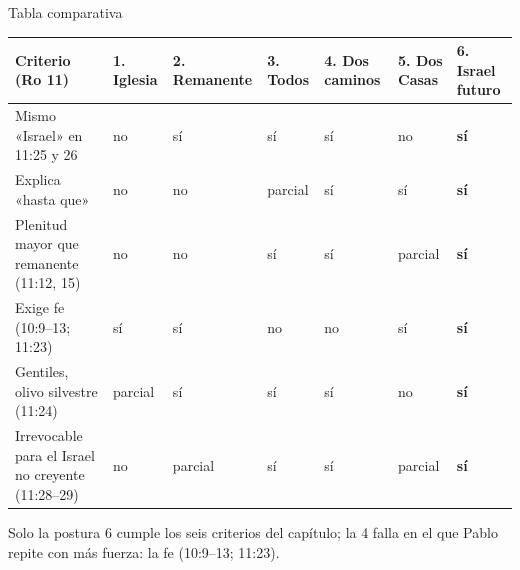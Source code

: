 \begin{frame}{Tabla comparativa}
\centering\scriptsize\renewcommand{\arraystretch}{1.3}
\begin{tabular}{>{\RaggedRight\arraybackslash}p{3.8cm}>{\centering\arraybackslash}p{0.95cm}>{\centering\arraybackslash}p{0.95cm}>{\centering\arraybackslash}p{0.95cm}>{\centering\arraybackslash}p{0.95cm}>{\centering\arraybackslash}p{0.95cm}>{\centering\arraybackslash}p{0.95cm}}
\toprule
\color{ladrillo}\bfseries Criterio (Ro 11) & \textbf{1. Iglesia} & \textbf{2. Rema\-nente} & \textbf{3. Todos} & \textbf{4. Dos caminos} & \textbf{5. Dos Casas} & \textbf{6. Israel futuro}\\\midrule
Mismo «Israel» en 11:25 y 26 & no & sí & sí & sí & no & \textbf{sí}\\
Explica «hasta que» & no & no & parcial & sí & sí & \textbf{sí}\\
Plenitud mayor que remanente (11:12, 15) & no & no & sí & sí & parcial & \textbf{sí}\\
Exige fe (10:9--13; 11:23) & sí & sí & no & no & sí & \textbf{sí}\\
Gentiles, olivo silvestre (11:24) & parcial & sí & sí & sí & no & \textbf{sí}\\
Irrevocable para el Israel no creyente (11:28--29) & no & parcial & sí & sí & parcial & \textbf{sí}\\
\bottomrule
\end{tabular}\par
\elabpropia\vspace{6pt}
\begin{clave}Solo la postura 6 cumple los seis criterios del capítulo; la 4 falla en el que Pablo repite con más fuerza: la fe (10:9--13; 11:23).\end{clave}
\end{frame}

